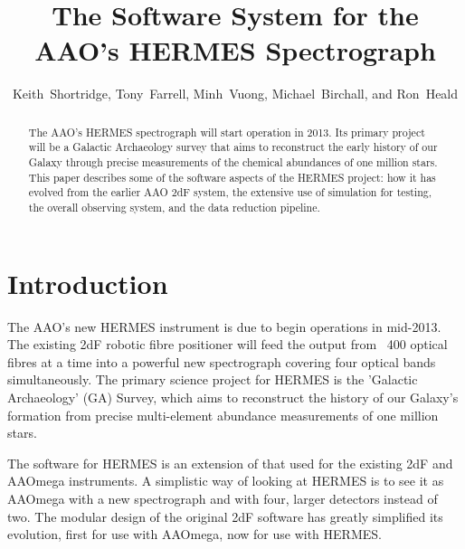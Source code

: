 
\resetcounters




\title{The Software System for the AAO's HERMES Spectrograph}
\author{Keith~Shortridge, Tony~Farrell, Minh~Vuong, Michael~Birchall, and Ron~Heald
}


\begin{abstract}
The AAO's HERMES spectrograph will start operation in 2013. Its primary project will be a Galactic Archaeology survey that aims to reconstruct the early history of our Galaxy through precise measurements of the chemical abundances of one million stars. This paper describes some of the software aspects of the HERMES project: how it has evolved from the earlier AAO 2dF system, the extensive use of simulation for testing, the overall observing system, and the data reduction pipeline.
\end{abstract}

\section{Introduction}

The AAO's new HERMES instrument \citep{Hermes_2010} is due to begin operations in mid-2013. The existing 2dF robotic fibre positioner will feed the output from ~400 optical fibres at a time into a powerful new spectrograph covering four optical bands simultaneously. The primary science project for HERMES is the 'Galactic Archaeology' (GA) Survey, which aims to reconstruct the history of our Galaxy's formation from precise multi-element abundance measurements of one million stars.

The software for HERMES is an extension of that used for the existing 2dF and AAOmega instruments. A simplistic way of looking at HERMES is to see it as AAOmega with a new spectrograph and with four, larger detectors instead of two. The modular design of the original 2dF software has greatly simplified its evolution, first for use with AAOmega, now for use with HERMES.

